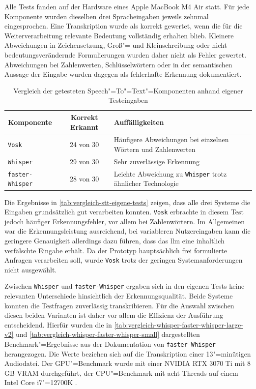 Alle Tests fanden auf der Hardware eines Apple MacBook M4 Air statt. Für jede Komponente wurden dieselben drei Spracheingaben jeweils zehnmal eingesprochen. Eine Transkription wurde als korrekt gewertet, wenn die für die Weiterverarbeitung relevante Bedeutung vollständig erhalten blieb. Kleinere Abweichungen in Zeichensetzung, Groß"= und Kleinschreibung oder nicht bedeutungsverändernde Formulierungen wurden daher nicht als Fehler gewertet. Abweichungen bei Zahlenwerten, Schlüsselwörtern oder in der semantischen Aussage der Eingabe wurden dagegen als fehlerhafte Erkennung dokumentiert.

\begin{table}[H]
  \caption{Vergleich der getesteten Speech"=To"=Text"=Komponenten anhand eigener Testeingaben}
  \label{tab:vergleich-stt-eigene-tests}
  \centering
  \setlength{\tabcolsep}{8pt}
  \begin{tabularx}{\textwidth}{l c L}
    \toprule
    \textbf{Komponente}     & \textbf{Korrekt Erkannt} & \textbf{Auffälligkeiten}                                           \\
    \midrule
    \texttt{Vosk}           & 24 von 30                & Häufigere Abweichungen bei einzelnen Wörtern und Zahlenwerten      \\
    \texttt{Whisper}        & 29 von 30                & Sehr zuverlässige Erkennung                                        \\
    \texttt{faster-Whisper} & 28 von 30                & Leichte Abweichung zu \texttt{Whisper} trotz ähnlicher Technologie \\
    \bottomrule
  \end{tabularx}
\end{table}

Die Ergebnisse in \autoref{tab:vergleich-stt-eigene-tests} zeigen, dass alle drei Systeme die Eingaben grundsätzlich gut verarbeiten konnten. \texttt{Vosk} erbrachte in diesem Test jedoch häufiger Erkennungsfehler, vor allem bei Zahlenwörtern. Im Allgemeinen war die Erkennungsleistung ausreichend, bei variableren Nutzereingaben kann die geringere Genauigkeit allerdings dazu führen, dass das \gls{llm} eine inhaltlich verfälschte Eingabe erhält. Da der Prototyp hauptsächlich frei formulierte Anfragen verarbeiten soll, wurde \texttt{Vosk} trotz der geringen Systemanforderungen nicht ausgewählt.

Zwischen \texttt{Whisper} und \texttt{faster-Whisper} ergaben sich in den eigenen Tests keine relevanten Unterschiede hinsichtlich der Erkennungsqualität. Beide Systeme konnten die Testfragen zuverlässig transkribieren. Für die Auswahl zwischen diesen beiden Varianten ist daher vor allem die Effizienz der Ausführung entscheidend. Hierfür wurden die in \autoref{tab:vergleich-whisper-faster-whisper-large-v2} und \autoref{tab:vergleich-whisper-faster-whisper-small} dargestellten Benchmark"=Ergebnisse aus der Dokumentation von \texttt{faster-Whisper} herangezogen. Die Werte beziehen sich auf die Transkription einer 13"=minütigen Audiodatei. Der GPU"=Benchmark wurde mit einer NVIDIA RTX 3070 Ti mit 8\,GB VRAM durchgeführt, der CPU"=Benchmark mit acht Threads auf einem Intel Core i7"=12700K \autocite{FasterWhisper-Documentation}.


